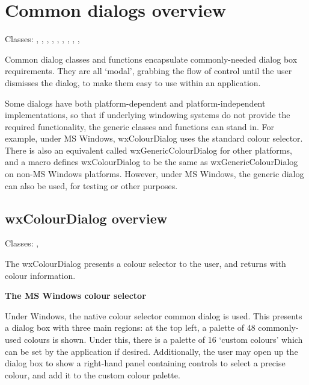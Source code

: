 \section{Common dialogs overview}\label{commondialogsoverview}

Classes: , ,
\rtfsp{}, ,\rtfsp
{}, ,\rtfsp
{},\rtfsp
{}, ,\rtfsp
{}

Common dialog classes and functions encapsulate commonly-needed dialog box requirements.
They are all `modal', grabbing the flow of control until the user dismisses the dialog,
to make them easy to use within an application.

Some dialogs have both platform-dependent and platform-independent implementations,
so that if underlying windowing systems do not provide the required functionality,
the generic classes and functions can stand in. For example, under MS Windows, wxColourDialog
uses the standard colour selector. There is also an equivalent called wxGenericColourDialog
for other platforms, and a macro defines wxColourDialog to be the same as wxGenericColourDialog
on non-MS Windows platforms. However, under MS Windows, the generic dialog can also be
used, for testing or other purposes.

\subsection{wxColourDialog overview}\label{wxcolourdialogoverview}

Classes: , 

The wxColourDialog presents a colour selector to the user, and returns
with colour information.

{\bf The MS Windows colour selector}

Under Windows, the native colour selector common dialog is used. This
presents a dialog box with three main regions: at the top left, a
palette of 48 commonly-used colours is shown. Under this, there is a
palette of 16 `custom colours' which can be set by the application if
desired. Additionally, the user may open up the dialog box to show
a right-hand panel containing controls to select a precise colour, and add
it to the custom colour palette.

